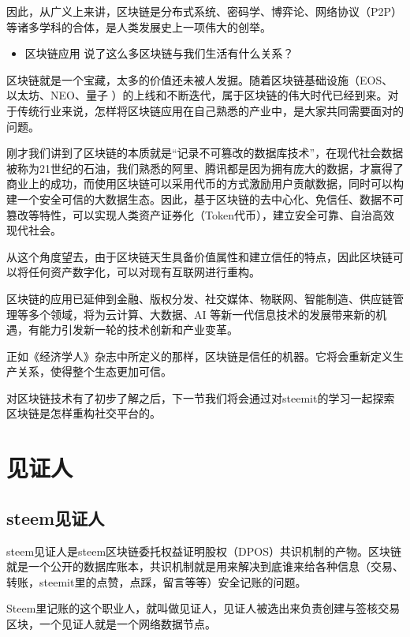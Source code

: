 \documentclass[]{ctexbook}
\providecommand{\tightlist}{%
  \setlength{\itemsep}{0pt}\setlength{\parskip}{0pt}}
\begin{document}
因此，从广义上来讲，区块链是分布式系统、密码学、博弈论、网络协议（P2P）等诸多学科的合体，是人类发展史上一项伟大的创举。

\begin{itemize}
\tightlist
\item
  区块链应用
  说了这么多区块链与我们生活有什么关系？
\end{itemize}

区块链就是一个宝藏，太多的价值还未被人发掘。随着区块链基础设施（EOS、以太坊、NEO、量子 ）的上线和不断迭代，属于区块链的伟大时代已经到来。对于传统行业来说，怎样将区块链应用在自己熟悉的产业中，是大家共同需要面对的问题。

刚才我们讲到了区块链的本质就是``记录不可篡改的数据库技术''，在现代社会数据被称为21世纪的石油，我们熟悉的阿里、腾讯都是因为拥有庞大的数据，才赢得了商业上的成功，而使用区块链可以采用代币的方式激励用户贡献数据，同时可以构建一个安全可信的大数据生态。因此，基于区块链的去中心化、免信任、数据不可篡改等特性，可以实现人类资产证券化（Token代币），建立安全可靠、自治高效现代社会。

从这个角度望去，由于区块链天生具备价值属性和建立信任的特点，因此区块链可以将任何资产数字化，可以对现有互联网进行重构。

区块链的应用已延伸到金融、版权分发、社交媒体、物联网、智能制造、供应链管理等多个领域，将为云计算、大数据、AI 等新一代信息技术的发展带来新的机遇，有能力引发新一轮的技术创新和产业变革。

正如《经济学人》杂志中所定义的那样，区块链是信任的机器。它将会重新定义生产关系，使得整个生态更加可信。

对区块链技术有了初步了解之后，下一节我们将会通过对steemit的学习一起探索区块链是怎样重构社交平台的。

\hypertarget{witneess}{%
\section{见证人}\label{witneess}}

\hypertarget{steem_jzr}{%
\subsection{steem见证人}\label{steem_jzr}}

steem见证人是steem区块链委托权益证明股权（DPOS）共识机制的产物。区块链就是一个公开的数据库账本，共识机制就是用来解决到底谁来给各种信息（交易、转账，steemit里的点赞，点踩，留言等等）安全记账的问题。

Steem里记账的这个职业人，就叫做见证人，见证人被选出来负责创建与签核交易区块，一个见证人就是一个网络数据节点。
\end{document}
